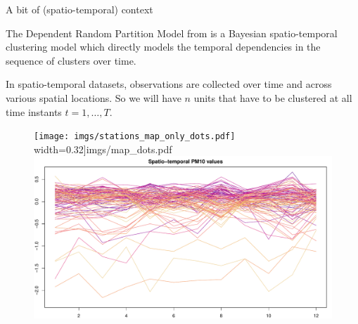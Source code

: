 \documentclass[
	11pt, %
 xcolor={dvipsnames,svgnames}
]{beamer}
\let\cite\citep
\begin{document}
\begin{frame}{A bit of (spatio-temporal) context}

\begin{block}{}
The Dependent Random Partition Model from \cite{1-drpm} is a Bayesian \alert{spatio-temporal} clustering model which directly models the temporal dependencies in the sequence of clusters over time.\\[6pt]
\end{block}
In spatio-temporal datasets, observations are collected over time and across various spatial locations.
So we will have $n$ units that have to be clustered at all time instants $t=1,\ldots,T$. 
\begin{figure}
    \centering
    \texttt{[image: imgs/stations\_map\_only\_dots.pdf]}
    width=0.32\linewidth]{imgs/map_dots.pdf}
    \includegraphics[clip, trim=0px 0px 0px 22px, width=0.54\linewidth]{imgs/test_2_spatial_data.pdf}
    \label{fig:enter-label}
\end{figure}

\end{frame}
\end{document}
